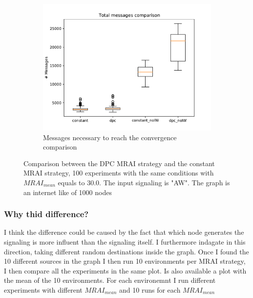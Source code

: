 \documentclass[10pt,conference,letterpaper]{IEEEtran}
\newcommand{\figwidth}{0.78}
\newcommand{\figvspace}{-1.5em}
\begin{document}
\begin{figure}[tb]
	\begin{subfigure}{\columnwidth}
		\centering
		\includegraphics[width=\figwidth\columnwidth]{images/internet_like/S_AW/constant-dpc-1000-comparison-30fixed_messages_boxplot.pdf}
		\caption{Messages necessary to reach the convergence comparison}
		\label{fig:s_aw_dpc_vs_constant_messages_1000}
		\qquad
	\end{subfigure}

	\caption{Comparison between the \ac{DPC} \ac{MRAI} strategy and the constant \ac{MRAI}
			 strategy, 100 experiments with the same conditions with $MRAI_{mean}$
			 equals to \num{30.0}. The input signaling is "AW". The graph is 
			 an internet like of \num{1000} nodes}
	\label{fig:s_aw_dpc_vs_constant_1000}
	\vspace{\figvspace}
\end{figure}

\subsubsection{Why thid difference?}

I think the difference could be caused by the fact that which node generates the
signaling is more influent than the signaling itself.
I furthermore indagate in this direction, taking different random destinations
inside the graph.
Once I found the 10 different sources in the graph I then run 10 environments 
per \ac{MRAI} strategy, I then compare all the experiments in the same plot.
Is also available a plot with the mean of the 10 environments.
For each environemnt I run different experiments with different $MRAI_{mean}$
and \num{10} runs for each $MRAI_{mean}$
\end{document}
